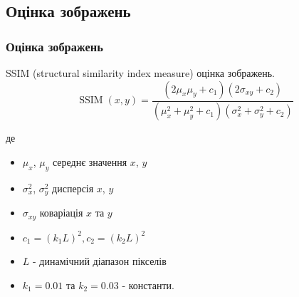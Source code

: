 \documentclass{beamer}
\newcounter{e}
\begin{document}
	\subsection{Оцінка зображень}
	\begin{frame}
		\frametitle{Оцінка зображень}
		\begin{block}{SSIM (structural similarity index measure) оцінка зображень.}
			\begin{equation}
				\label{eq:SSIM}
				\operatorname{SSIM}(x, y)=\frac{\left(2 \mu_{x} \mu_{y}+c_{1}\right)\left(2 \sigma_{x 			y}+c_{2}\right)}{\left(\mu_{x}^{2}+\mu_{y}^{2}+c_{1}\right)\left(\sigma_{x}^{2}+\sigma_{y}^{2}+c_{2}\right)}
			\end{equation}
		\end{block}
		де
		\begin{itemize}
			\item $\mu_{x}$, $\mu_{y}$  середнє значення $x$, $y$
			\item $\sigma_{x}^{2}$, $\sigma_{y}^{2}$ дисперсія $x$, $y$
			\item $\sigma_{x y}$ коваріація $x$ та $y$
			\item $c_{1}=\left(k_{1} L\right)^{2}, c_{2}=\left(k_{2} L\right)^{2}$
			\item $L$ - динамічний діапазон пікселів
			\item $k_{1}=0.01$ та $k_{2}=0.03$ - константи.	
		\end{itemize}
	\end{frame}
	
\end{document}

